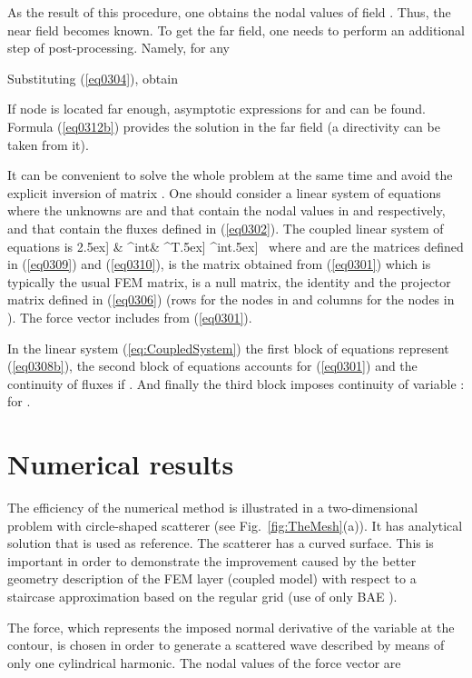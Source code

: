 \documentclass[12pt]{article}
\newcommand{\rin}{{\rm int}}
\newcommand{\A}{\mathbf{A}}
\newcommand{\matPI}{\mathbf{\Pi}}
\newcommand{\Zero}{\mathbf{0}}
\newcommand{\fref}[1]{Fig.~\ref{#1}}
\begin{document}
As the result of this procedure, one obtains the nodal values of field . Thus,
the near field becomes known. To get the far field, one needs to perform an additional step of post-processing.
Namely, for any 

Substituting (\ref{eq0304}), obtain

If node  is located far enough, asymptotic expressions for  and  can be found.
Formula (\ref{eq0312b}) provides the solution in the far field (a directivity can be taken from it).

It can be convenient to solve the whole problem at the same time and avoid the explicit inversion of matrix .
One should consider a linear system of equations where the unknowns are  and  that contain the nodal values in  and  respectively, and  that contain the fluxes  defined in (\ref{eq0302}). The coupled linear system of equations is
2.5ex]
    \Zero  & \A^\rin & \matPI^T\2.5ex]
 ^\rin \2.5ex]
  \
where  and  are the matrices defined in (\ref{eq0309}) and  (\ref{eq0310}),  is the matrix obtained from (\ref{eq0301}) which is typically the usual FEM matrix,  is a null matrix,  the identity and  the projector matrix defined in (\ref{eq0306}) (rows for the nodes in  and columns for the nodes in ). The force vector includes  from (\ref{eq0301}).

In the linear system (\ref{eq:CoupledSystem}) the first block of equations represent (\ref{eq0308b}), the second block of equations accounts for (\ref{eq0301}) and the continuity of fluxes  if . And finally the third block imposes continuity of variable :  for .






\section{Numerical results}
\label{sec:NumericalExamples}

The efficiency of the numerical method is illustrated in a two-dimensional problem with circle-shaped scatterer (see \fref{fig:TheMesh}(a)). It has analytical solution that is used as reference. The scatterer has a curved surface. This is important in order to demonstrate the improvement caused by the better geometry description of the FEM layer (coupled model) with respect to a staircase approximation based on the regular grid (use of only BAE \cite{poblet-PVS:2015}).


The force, which represents the imposed normal derivative of the variable  at the contour, is chosen in order to generate a scattered wave described by means of only one cylindrical harmonic. The nodal values of the force vector are
\end{document}
